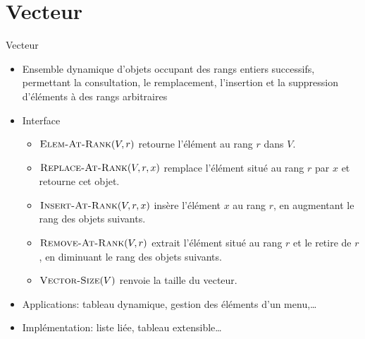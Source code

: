 \section{Vecteur}

\begin{frame}{Vecteur}

\begin{itemize}
\item Ensemble dynamique d'objets occupant des rangs entiers
  successifs, permettant la consultation, le remplacement, l'insertion
  et la suppression d'éléments à des rangs arbitraires
\item Interface
\begin{itemize}
\item $\textnormal{\scshape Elem-At-Rank}(V,r)$ retourne l'élément au rang $r$ dans $V$.
\item $\textnormal{\scshape Replace-At-Rank}(V,r,x)$ remplace l'élément situé au rang $r$ par $x$ et retourne cet objet.
\item $\textnormal{\scshape Insert-At-Rank}(V,r,x)$ insère l'élément $x$ au rang $r$, en augmentant le rang des objets suivants.
\item $\textnormal{\scshape Remove-At-Rank}(V,r)$ extrait l'élément situé au rang $r$ et le retire de $r$, en diminuant le rang des objets suivants.
\item $\textnormal{\scshape Vector-Size}(V)$ renvoie la taille du vecteur.
\end{itemize}
\item Applications: tableau dynamique, gestion des éléments d'un menu,\ldots
\item Implémentation: liste liée, tableau extensible\ldots
\end{itemize}

\end{frame}

